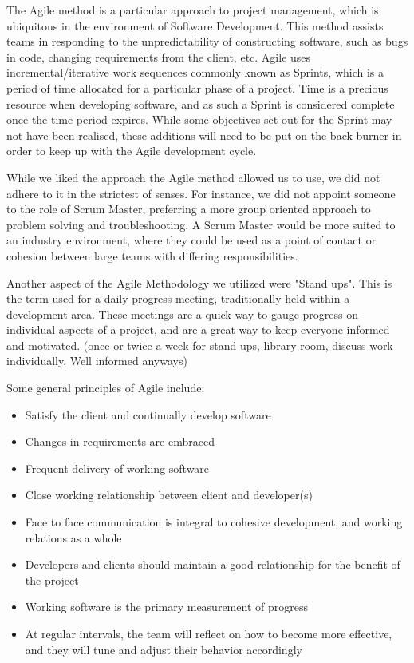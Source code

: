 The Agile method is a particular approach to project management, which is ubiquitous in the environment of Software Development. This method assists teams in responding to the unpredictability of constructing software, such as bugs in code, changing requirements from the client, etc. Agile uses incremental/iterative work sequences commonly known as Sprints, which is a period of time allocated for a particular phase of a project. Time is a precious resource when developing software, and as such a Sprint is considered complete once the time period expires. While some objectives set out for the Sprint may not have been realised, these additions will need to be put on the back burner in order to keep up with the Agile development cycle.

While we liked the approach the Agile method allowed us to use, we did not adhere to it in the strictest of senses. For instance, we did not appoint someone to the role of Scrum Master, preferring a more group oriented approach to problem solving and troubleshooting. A Scrum Master would be more suited to an industry environment, where they could be used as a point of contact or cohesion between large teams with differing responsibilities.

Another aspect of the Agile Methodology we utilized were "Stand ups". This is the term used for a daily progress meeting, traditionally held within a development area. These meetings are a quick way to gauge progress on individual aspects of a project, and are a great way to keep everyone informed and motivated. (once or twice a week for stand ups, library room, discuss work individually. Well informed anyways)

Some general principles of Agile include:

\begin{itemize}
    \item{Satisfy the client and continually develop software}
    \item{Changes in requirements are embraced}
    \item{Frequent delivery of working software} 
    \item{Close working relationship between client and developer(s)}
    \item{Face to face communication is integral to cohesive development, and working relations as a whole}
    \item{Developers and clients should maintain a good relationship for the benefit of the project}
    \item{Working software is the primary measurement of progress}
    \item{At regular intervals, the team will reflect on how to become more effective, and they will tune and adjust their behavior accordingly}
\end{itemize}

